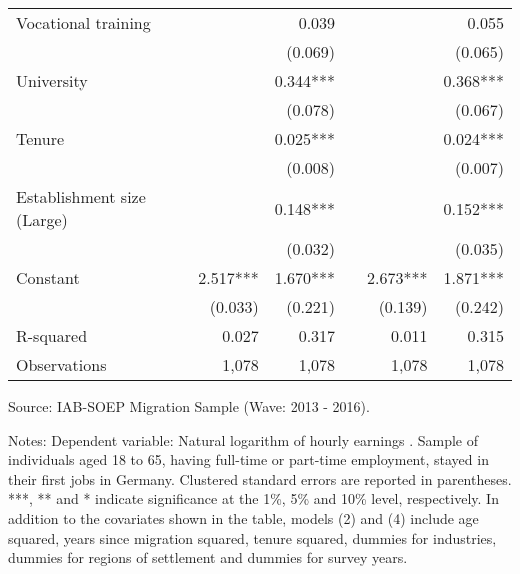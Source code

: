 \documentclass[12pt,a4paper]{article}
\begin{document}
\begin{table}[htbp]
{\begin{tabular}{p{15em}rrrrr}
    Vocational training &       & 0.039 &       &       & 0.055 \\
                              &       & (0.069) &       &       & (0.065) \\
    University &       & 0.344*** &       &       & 0.368*** \\
    \multicolumn{1}{l}{                         } &       & (0.078) &       &       & (0.067) \\
    \multicolumn{1}{l}{Tenure} &       & 0.025*** &       &       & 0.024*** \\
    \multicolumn{1}{l}{                         } &       & (0.008) &       &       & (0.007) \\
    \multicolumn{1}{l}{Establishment size (Large)} &       & 0.148*** &       &       & 0.152*** \\
    \multicolumn{1}{l}{                         } &       & (0.032) &       &       & (0.035) \\
    \multicolumn{1}{l}{Constant                 } & 2.517*** & 1.670*** &       & 2.673*** & 1.871*** \\
    \multicolumn{1}{l}{                         } & (0.033) & (0.221) &       & (0.139) & (0.242) \\
    \multicolumn{1}{l}{R-squared} & 0.027 & 0.317 &       & 0.011 & 0.315 \\
    Observations &       1,078    &        1,078    &       &            1,078    &            1,078    \\
    \bottomrule
    \end{tabular}%
}

\begin{tablenotes}
      \small
      \item Source: IAB-SOEP Migration Sample (Wave: 2013 - 2016).
      \item Notes: Dependent variable: Natural logarithm of hourly earnings . Sample of individuals aged 18 to 65, having full-time or part-time employment, stayed in their first jobs in Germany. Clustered standard errors are reported in parentheses.  ***, ** and * indicate significance at the 1\%, 5\% and 10\% level, respectively. In addition to the covariates shown in the table, models (2) and (4) include age squared, years since migration squared, tenure squared, dummies for industries, dummies for regions of settlement and dummies for survey years.
    \end{tablenotes}
\end{table}%
\end{document}

